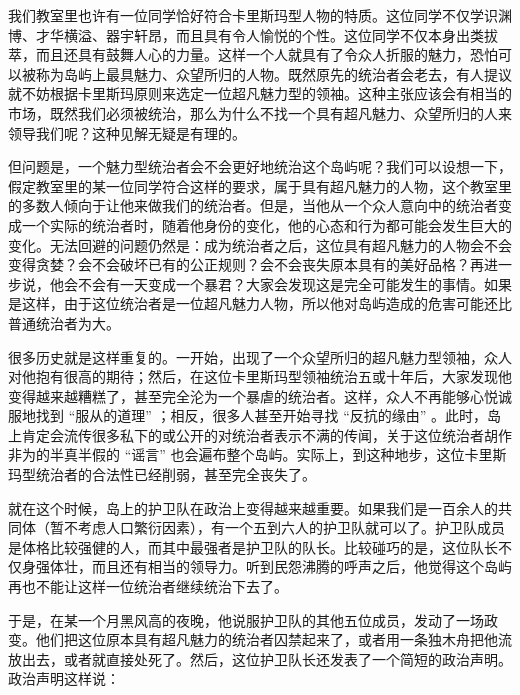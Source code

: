我们教室里也许有一位同学恰好符合卡里斯玛型人物的特质。这位同学不仅学识渊博、才华横溢、器宇轩昂，而且具有令人愉悦的个性。这位同学不仅本身出类拔萃，而且还具有鼓舞人心的力量。这样一个人就具有了令众人折服的魅力，恐怕可以被称为岛屿上最具魅力、众望所归的人物。既然原先的统治者会老去，有人提议就不妨根据卡里斯玛原则来选定一位超凡魅力型的领袖。这种主张应该会有相当的市场，既然我们必须被统治，那么为什么不找一个具有超凡魅力、众望所归的人来领导我们呢？这种见解无疑是有理的。

但问题是，一个魅力型统治者会不会更好地统治这个岛屿呢？我们可以设想一下，假定教室里的某一位同学符合这样的要求，属于具有超凡魅力的人物，这个教室里的多数人倾向于让他来做我们的统治者。但是，当他从一个众人意向中的统治者变成一个实际的统治者时，随着他身份的变化，他的心态和行为都可能会发生巨大的变化。无法回避的问题仍然是：成为统治者之后，这位具有超凡魅力的人物会不会变得贪婪？会不会破坏已有的公正规则？会不会丧失原本具有的美好品格？再进一步说，他会不会有一天变成一个暴君？大家会发现这是完全可能发生的事情。如果是这样，由于这位统治者是一位超凡魅力人物，所以他对岛屿造成的危害可能还比普通统治者为大。

很多历史就是这样重复的。一开始，出现了一个众望所归的超凡魅力型领袖，众人对他抱有很高的期待；然后，在这位卡里斯玛型领袖统治五或十年后，大家发现他变得越来越糟糕了，甚至完全沦为一个暴虐的统治者。这样，众人不再能够心悦诚服地找到 “服从的道理” ；相反，很多人甚至开始寻找 “反抗的缘由” 。此时，岛上肯定会流传很多私下的或公开的对统治者表示不满的传闻，关于这位统治者胡作非为的半真半假的 “谣言” 也会遍布整个岛屿。实际上，到这种地步，这位卡里斯玛型统治者的合法性已经削弱，甚至完全丧失了。

就在这个时候，岛上的护卫队在政治上变得越来越重要。如果我们是一百余人的共同体（暂不考虑人口繁衍因素），有一个五到六人的护卫队就可以了。护卫队成员是体格比较强健的人，而其中最强者是护卫队的队长。比较碰巧的是，这位队长不仅身强体壮，而且还有相当的领导力。听到民怨沸腾的呼声之后，他觉得这个岛屿再也不能让这样一位统治者继续统治下去了。

于是，在某一个月黑风高的夜晚，他说服护卫队的其他五位成员，发动了一场政变。他们把这位原本具有超凡魅力的统治者囚禁起来了，或者用一条独木舟把他流放出去，或者就直接处死了。然后，这位护卫队长还发表了一个简短的政治声明。政治声明这样说：


